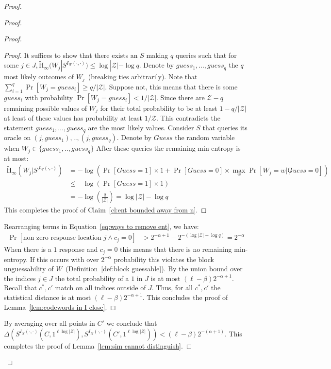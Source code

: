 \documentclass[11pt]{article}
\newcommand{\defref}[1]{\mbox{Definition~\ref{#1}}}
\newcommand{\lemref}[1]{\mbox{Lemma~\ref{#1}}}
\newcommand{\clref}[1]{\mbox{Claim~\ref{#1}}}
\newcommand{\Hav}{\tilde{\mathrm{H}}_\infty}
\begin{document}
\begin{proof}
\begin{proof}
\begin{proof}
\begin{proof}
It suffices to show that there exists an $S$ making $q$ queries such that for some $j\in J, \Hav(W_j | S^{I_{W}(\cdot, \cdot)})\le \log |\mathcal{Z}| - \log q$.  Denote by $guess_{1}, ..., guess_q$ the $q$ most likely outcomes of $W_j$~(breaking ties arbitrarily).  Note that $\sum_{i=1}^q \Pr[W_j = guess_i]\geq q/|\mathcal{Z}|$.  Suppose not, this means that there is some $guess_i$ with probability $\Pr[W_j = guess_i] < 1/|\mathcal{Z}|$.  Since there are $\mathcal{Z} - q $ remaining possible values of $W_j$ for their total probability to be at least $1-q/|\mathcal{Z}|$ at least of these values has probability at least $1/\mathcal{Z}$.  This contradicts the statement $guess_1,..., guess_q$ are the most likely values.  Consider $S$ that queries its oracle on $(j, guess_1),.., (j, guess_q)$.  Denote by $Guess$ the random variable when $W_j\in \{guess_1,.., guess_q\}$  After these queries the remaining min-entropy is at most:
\begin{align*}
\Hav(W_j | S^{J_W(\cdot, \cdot)}) &=  -\log \left(\Pr[Guess=1]\times 1+ \Pr[Guess=0]\times \max_{w}\Pr[W_j = w|\not Guess =0]\right)\\
&\leq  -\log \left(\Pr[Guess=1]\times 1\right)\\
&=-\log\left( \frac{q}{|\mathcal{Z}|} \right) = \log|\mathcal{Z}|-\log q
\end{align*}
This completes the proof of \clref{cl:ent bounded away from n}.
\end{proof}
\noindent
Rearranging terms in Equation~\ref{eq:ways to remove ent}, we have:
\begin{align*}
 \Pr[\text{non zero response location }j \wedge c_j=0] &>2^{-\alpha+1} - 2^{-(\log |\mathcal{Z}|-\log q)}=  2^{-\alpha}
 \end{align*}
 When there is a $1$ response and $c_j=0$ this means that there is no remaining min-entropy.  If this occurs with over $2^{-\alpha}$ probability this violates the block unguessability of $W$~(\defref{def:block guessable}).  By the union bound over the indices $j\in J$ the total probability of a $1$ in $J$ is at most $(\ell-\beta)2^{-\alpha+1}$. Recall that $c^*, c'$ match on all indices outside of $J$. Thus, for all $c^*, c'$ the statistical distance is at most $(\ell- \beta)2^{-\alpha+1}$.  This concludes the proof of \lemref{lem:codewords in I close}.
\end{proof}
By averaging over all points in $C'$ we conclude that $\Delta(S^{I_X(\cdot, \cdot)}(C, 1^{\ell \log |Z|}), S^{I_X(\cdot, \cdot)}(C', 1^{\ell \log |Z|})) < (\ell -\beta)2^{-(\alpha+1)}$.  This completes the proof of \lemref{lem:sim cannot distinguish}.
\end{proof}


\end{proof}
\end{document}
